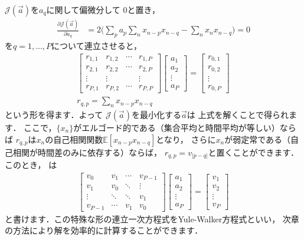 $\mathcal{J}(\Vec{a})$を$a_q$に関して偏微分して
0と置き，
\begin{align}
\frac{\partial\mathcal{J}(\Vec{a})}{\partial a_q}
&=
2
\bigg(
\sum_p a_p
\sum_n x_{n-p}x_{n-q}
-
\sum_n x_n x_{n-q}
\bigg)
=0
\end{align}
を$q = 1,\ldots, P$について連立させると，
\begin{align}
\begin{bmatrix}
r_{1,1} & r_{1,2} & \cdots & r_{1,P}\\
r_{2,1} & r_{2,2} & \cdots & r_{2,P}\\
\vdots  & \vdots & & \vdots\\
r_{P,1} & r_{P,2} & \cdots & r_{P,P}
\end{bmatrix}
\begin{bmatrix}
a_1\\
a_2\\
\vdots\\
a_P
\end{bmatrix}
=
\begin{bmatrix}
r_{0,1}\\
r_{0,2}\\
\vdots\\
r_{0,P}
\end{bmatrix}
\label{eq:lpc_YuleWalker}\\
r_{q,p} = \sum_{n} x_{n-p}x_{n-q}
\end{align}
という形を得ます．よって
$\mathcal{J}(\Vec{a})$を最小化する$\Vec{a}$は
上式を解くことで得られます．
ここで，$\{x_n\}$がエルゴード的である（集合平均と時間平均が等しい）ならば
$r_{q,p}$は$x_n$の自己相関関数$\mathbb{E}[x_{n-p}x_{n-q}]$となり，
さらに$x_n$が弱定常である（自己相関が時間差のみに依存する）ならば，
$r_{q,p} = v_{|p-q|}$と置くことができます．このとき，
は
\begin{align}
\begin{bmatrix}
v_{0} & v_{1} & \cdots & v_{P-1}\\
v_{1} & v_{0} & \ddots & \vdots\\
\vdots & \ddots & \ddots & v_{1}\\
v_{P-1} & \cdots & v_{1} & v_{0}
\end{bmatrix}
\begin{bmatrix}
a_1\\
a_2\\
\vdots\\
a_P
\end{bmatrix}
=
\begin{bmatrix}
v_{1}\\
v_{2}\\
\vdots\\
v_{P}
\end{bmatrix}
\label{eq:lpc_YuleWalker2}
\end{align}
と書けます．この特殊な形の連立一次方程式をYule-Walker方程式といい，
次章の方法により解を効率的に計算することができます．



